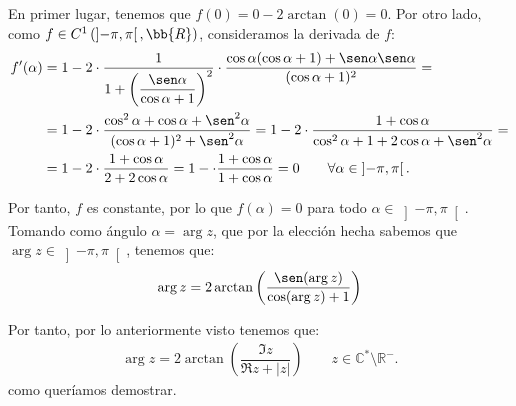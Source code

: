 \begin{ejercicio}
    En primer lugar, tenemos que $f(0)=0-2\arctan(0)=0$. Por otro lado, como $f\in C^1\left(\left]-\pi,\pi\right[,\bb{R}\right)$, consideramos la derivada de $f$:
    \begin{align*}
        f'(\alpha) &= 1 - 2\cdot \dfrac{1}{1+\left(\dfrac{\sen\alpha}{\cos\alpha + 1}\right)^2}\cdot \dfrac{\cos\alpha(\cos\alpha + 1) + \sen\alpha\sen\alpha}{(\cos\alpha + 1)^2} =\\&=
        1-2\cdot \dfrac{\cos^2\alpha+\cos\alpha+\sen^2\alpha}{(\cos\alpha + 1)^2+\sen^2\alpha}=
        1-2\cdot \dfrac{1+\cos\alpha}{\cos^2\alpha + 1+2\cos\alpha+\sen^2\alpha}
        =\\&=
        1-2\cdot \dfrac{1+\cos\alpha}{2+2\cos\alpha}
        = 1-\cdot \dfrac{1+\cos\alpha}{1+\cos\alpha} = 0\qquad \forall \alpha\in \left]-\pi,\pi\right[.
    \end{align*}



    Por tanto, $f$ es constante, por lo que $f(\alpha)=0$ para todo $\alpha\in \left]-\pi,\pi\right[$. Tomando como ángulo $\alpha=\arg z$, que por la elección hecha sabemos que $\arg z \in \left]-\pi,\pi\right[$, tenemos que: 
    \begin{equation*}
        \arg z = 2\arctan\left(\dfrac{\sen(\arg z)}{\cos(\arg z) + 1}\right)
    \end{equation*}

    Por tanto, por lo anteriormente visto tenemos que:
    \begin{align*}
        \arg z = 2\arctan\left(\dfrac{\Im z}{\Re z + |z|}\right)\qquad z\in \mathbb{C}^\ast \setminus \mathbb{R}^-.
    \end{align*}
    como queríamos demostrar.
\end{ejercicio}

